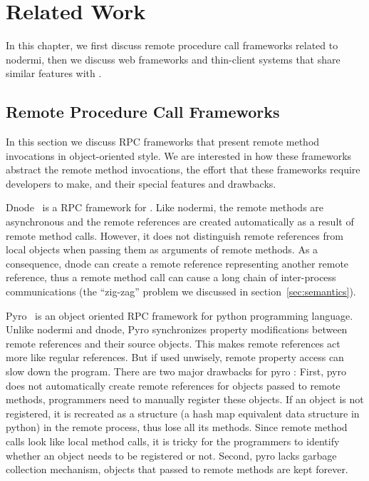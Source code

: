 \chapter{Related Work}

In this chapter, we first discuss remote procedure call frameworks 
related to nodermi, then we discuss web frameworks and thin-client systems
that share similar features with \cb.

\section{Remote Procedure Call Frameworks}
\label{sec:relatedrpc}

In this section we  discuss RPC frameworks that present remote method
invocations in object-oriented style.  We are interested in how these
frameworks abstract the remote method invocations, the effort that these
frameworks require developers to make, and their special features and
drawbacks.


Dnode~\cite{dnode} is a RPC framework for \nodejs{}.  Like nodermi, the remote
methods are asynchronous and the remote references are created automatically
as a result of remote method calls. However, it does not distinguish remote
references from local objects  when passing them as arguments of remote
methods. As a consequence, dnode can create a remote reference representing
another remote reference,  thus  a remote method call can cause a long chain
of inter-process communications (the ``zig-zag'' problem we discussed in
section~\ref{sec:semantics}). 



 
Pyro~\cite{pyro} is an object oriented RPC framework for python programming
language. Unlike nodermi and dnode, Pyro synchronizes  property modifications
between remote references and their source objects. This makes remote
references act more like regular references.  But if used unwisely, remote
property access can slow down the program. There are two major drawbacks for
pyro : First, pyro does not automatically create remote references for objects
passed to remote methods, programmers need to manually register these objects.
If an object is not registered, it is recreated as a  structure (a
hash map equivalent data structure in python) in the remote process, thus lose
all its methods. Since remote method calls look like local method calls, it is
tricky for the programmers to identify whether an object needs to be
registered or not. Second, pyro lacks garbage collection mechanism, objects
that passed to remote methods are kept forever.


